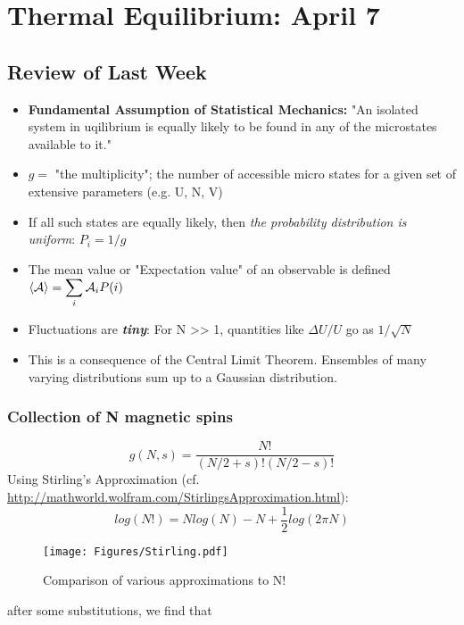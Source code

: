\section{Thermal Equilibrium: April 7}

\subsection{Review of Last Week}
\begin{itemize}
\item \textbf{Fundamental Assumption of Statistical Mechanics:} "An isolated system in uqilibrium is equally likely to be found in any of the microstates available to it."

\item $g =$ "the multiplicity"; the number of accessible micro states for a given set of extensive parameters (e.g. U, N, V)

\item If all such states are equally likely, then \textit{the probability distribution is uniform}: $P_i = 1/g$

\item The mean value or "Expectation value" of an observable  is defined 
  $\Braket{\mathcal{A}} = \displaystyle \sum_{i} \mathcal{A}_i P(i)$

\item Fluctuations are \textit{\textbf{tiny}}: For N >> 1, quantities like $\Delta U/U$ go as $1/\sqrt{N}$

\item This is a consequence of the Central Limit Theorem. Ensembles of many varying distributions sum up to a Gaussian distribution.

\end{itemize}

\subsubsection{Collection of N magnetic spins}
\begin{equation}
g(N,s) = \frac{N!}{(N/2 + s)! (N/2-s)!}
\end{equation}
Using Stirling's Approximation (cf. \url{http://mathworld.wolfram.com/StirlingsApproximation.html}):
\begin{equation}
log(N!) = N log(N) - N + \frac{1}{2}log(2 \pi N)
\end{equation}
\begin{figure}[h]
\centering
\texttt{[image: Figures/Stirling.pdf]}
\caption{Comparison of various approximations to N!}
\end{figure}
after some substitutions, we find that

